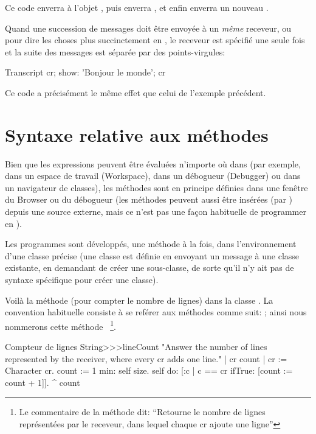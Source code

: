 \documentclass[a4paper,10pt,twoside]{book}
\begin{document}
\noindent
Ce code enverra  \`{a} l'objet , puis
enverra  , et enfin enverra un nouveau .

Quand une succession de messages doit \^{e}tre envoy\'{e}e \`{a} un \emph{m\^{e}me} receveur, 
ou pour dire les choses plus succinctement en , le receveur est sp\'{e}cifi\'{e} une seule fois et la suite des messages est s\'{e}par\'{e}e par des points-virgules:

\begin{code}{}
Transcript cr;
    show: 'Bonjour le monde';
    cr
\end{code}
Ce code a pr\'{e}cis\'{e}ment le m\^{e}me effet que celui de l'exemple pr\'{e}c\'{e}dent.


\section{Syntaxe relative aux m\'{e}thodes}
Bien que les expressions peuvent \^{e}tre \'{e}valu\'{e}es n'importe
o\`{u} dans \sq (par exemple, dans un espace de travail (Workspace),
dans un d\'{e}bogueur (Debugger) ou dans un navigateur de classes), 
les m\'{e}thodes sont en principe d\'{e}finies dans une fen\^{e}tre du Browser ou du d\'{e}bogueur
(les m\'{e}thodes peuvent aussi \^{e}tre insérées (par )
depuis une source externe, mais ce n'est pas une fa\c{c}on habituelle de programmer en \sq).

Les programmes sont d\'{e}velopp\'{e}s, une m\'{e}thode \`{a} la fois,
dans l'environnement d'une classe pr\'{e}cise (une classe est d\'{e}finie en envoyant un message \`{a} une classe existante, en demandant de cr\'{e}er une sous-classe, de sorte qu'il n'y ait pas de syntaxe sp\'{e}cifique pour cr\'{e}er une classe).

Voil\`{a} la m\'{e}thode  (pour compter le
nombre de lignes) dans la classe  .
La convention habituelle consiste à se ref\'{e}rer aux m\'{e}thodes
comme suit: ; ainsi nous nommerons cette
m\'{e}thode ~\footnote{Le commentaire de la
  m\'ethode dit: 
``Retourne le nombre de lignes représentées par le receveur, dans
    lequel chaque cr ajoute une ligne''}.

\begin{method}[lineCount]{Compteur de lignes}
String>>>lineCount
   "Answer the number of lines represented by the receiver,
   where every cr adds one line."
   | cr count |
   cr := Character cr.
   count := 1  min: self size.
   self do:
      [:c | c == cr ifTrue: [count := count + 1]].
   ^ count
\end{method}
\end{document}
